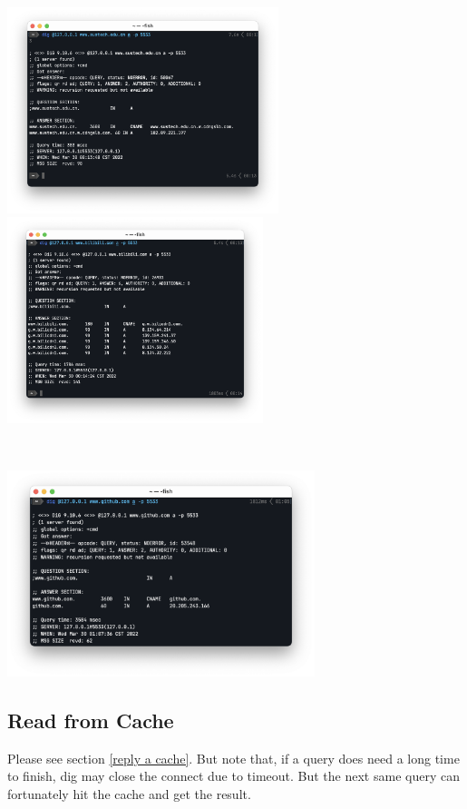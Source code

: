 \documentclass[onecolumn, oneside, ctexart]{SUSTechHomework}
\begin{document}
\centerline{\includegraphics[height=6cm]{fig/c2}\quad
			\includegraphics[height=6cm]{fig/c3}}\\
\centerline{\includegraphics[height=6cm]{fig/c4}}

\subsection{Read from Cache}
Please see section \ref{reply a cache}. But note that, if a query does need a long time to finish, dig may close the connect due to timeout. But the next same query can fortunately hit the cache and get the result.
\end{document}
